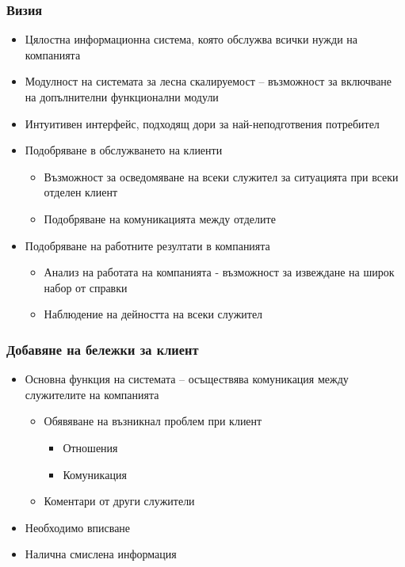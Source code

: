 \begin{frame}
  \frametitle{Визия}
  \begin{itemize}
    \item Цялостна информационна система, която обслужва всички нужди на компанията
    \item Модулност на системата за лесна скалируемост – възможност за включване на допълнителни функционални модули
    \item Интуитивен интерфейс, подходящ дори за най-неподготвения потребител 
  \end{itemize}
\end{frame}

\begin{frame}
  \begin{itemize}
    \item Подобряване в обслужването на клиенти
      \begin{itemize}
	\item Възможност за осведомяване на всеки служител за ситуацията при всеки отделен клиент
	\item Подобряване на комуникацията между отделите
      \end{itemize}
    \item Подобряване на работните резултати в компанията
      \begin{itemize}
	\item Анализ на работата на компанията  - възможност за извеждане на широк набор от справки
	\item Наблюдение на дейността на всеки служител
      \end{itemize}
  \end{itemize}
\end{frame}

\begin{frame}
  \frametitle{Добавяне на бележки за клиент}
  \begin{itemize}
    \item Основна функция на системата – осъществява комуникация между служителите на компанията
      \begin{itemize}
	\item Обявяване на възникнал проблем при клиент
	  \begin{itemize}
	    \item Отношения
	    \item Комуникация
	  \end{itemize}
	\item Коментари от други служители
      \end{itemize}
    \item Необходимо вписване 
    \item Налична смислена информация
  \end{itemize}
\end{frame}
